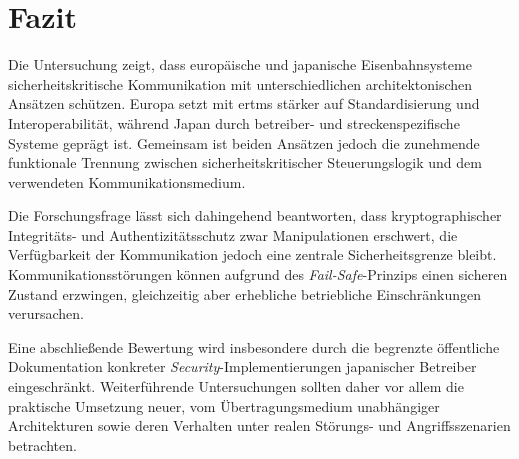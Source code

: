 \documentclass[runningheads]{res/llncs}
\begin{document}
\section{Fazit}
\label{sec:Fazit}

Die Untersuchung zeigt, dass europäische und japanische Eisenbahnsysteme sicherheitskritische Kommunikation mit unterschiedlichen architektonischen Ansätzen schützen. Europa setzt mit \gls{ertms} stärker auf Standardisierung und Interoperabilität, während Japan durch betreiber- und streckenspezifische Systeme geprägt ist. Gemeinsam ist beiden Ansätzen jedoch die zunehmende funktionale Trennung zwischen sicherheitskritischer Steuerungslogik und dem verwendeten Kommunikationsmedium.

Die Forschungsfrage lässt sich dahingehend beantworten, dass kryptographischer Integritäts- und Authentizitätsschutz zwar Manipulationen erschwert, die Verfügbarkeit der Kommunikation jedoch eine zentrale Sicherheitsgrenze bleibt. Kommunikationsstörungen können aufgrund des \textit{Fail-Safe}-Prinzips einen sicheren Zustand erzwingen, gleichzeitig aber erhebliche betriebliche Einschränkungen verursachen.

Eine abschließende Bewertung wird insbesondere durch die begrenzte öffentliche Dokumentation konkreter \textit{Security}-Implementierungen japanischer Betreiber eingeschränkt. Weiterführende Untersuchungen sollten daher vor allem die praktische Umsetzung neuer, vom Übertragungsmedium unabhängiger Architekturen sowie deren Verhalten unter realen Störungs- und Angriffsszenarien betrachten.

\newpage



\newpage
\printbibliography

% 
% 
\end{document}
